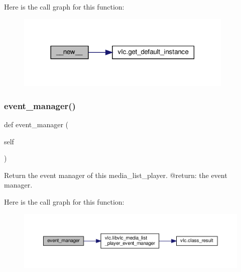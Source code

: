 Here is the call graph for this function\+:
\nopagebreak
\begin{figure}[H]
\begin{center}
\leavevmode
\includegraphics[width=294pt]{classvlc_1_1_media_list_player_aaff5444cab9af1af2e1471e196ef53e3_cgraph}
\end{center}
\end{figure}
\mbox{\label{classvlc_1_1_media_list_player_ab7c92812cd259eb8e4e4fd292b81bfaa}} 
\subsubsection{\texorpdfstring{event\+\_\+manager()}{event\_manager()}}
{\footnotesize\ttfamily def event\+\_\+manager (\begin{DoxyParamCaption}\item[{}]{self }\end{DoxyParamCaption})}

\begin{DoxyVerb}Return the event manager of this media_list_player.
@return: the event manager.
\end{DoxyVerb}
 Here is the call graph for this function\+:
\nopagebreak
\begin{figure}[H]
\begin{center}
\leavevmode
\includegraphics[width=350pt]{classvlc_1_1_media_list_player_ab7c92812cd259eb8e4e4fd292b81bfaa_cgraph}
\end{center}
\end{figure}
\mbox{\label{classvlc_1_1_media_list_player_a56c15bafa43c856366863fc07fc4021f}} 
